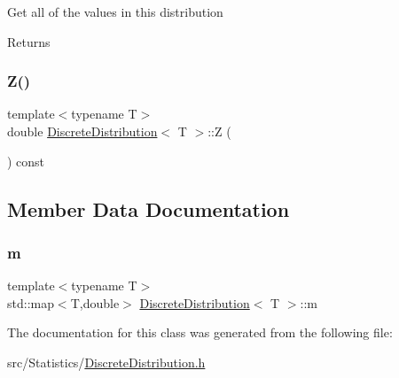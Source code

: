 Get all of the values in this distribution \begin{DoxyReturn}{Returns}

\end{DoxyReturn}
\mbox{\label{class_discrete_distribution_ad634a339172a69c006fded1beb423bb7}} 
\subsubsection{\texorpdfstring{Z()}{Z()}}
{\footnotesize\ttfamily template$<$typename T$>$ \\
double \hyperlink{class_discrete_distribution}{Discrete\+Distribution}$<$ T $>$\+::Z (\begin{DoxyParamCaption}{ }\end{DoxyParamCaption}) const\hspace{0.3cm}{\ttfamily [inline]}}



\subsection{Member Data Documentation}
\mbox{\label{class_discrete_distribution_a72a09b5b79a5bf0c55f780b9a81271fb}} 
\subsubsection{\texorpdfstring{m}{m}}
{\footnotesize\ttfamily template$<$typename T$>$ \\
std\+::map$<$T,double$>$ \hyperlink{class_discrete_distribution}{Discrete\+Distribution}$<$ T $>$\+::m}



The documentation for this class was generated from the following file\+:\begin{DoxyCompactItemize}
\item 
src/\+Statistics/\hyperlink{_discrete_distribution_8h}{Discrete\+Distribution.\+h}\end{DoxyCompactItemize}
